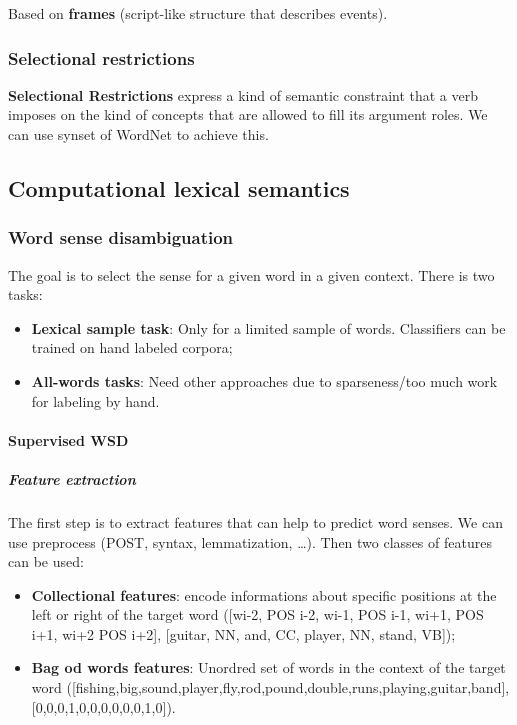 Based on \textbf{frames} (script-like structure that describes events).

\subsubsection{Selectional restrictions}

\textbf{Selectional Restrictions} express a kind of semantic constraint that a verb imposes on the kind of concepts that are allowed to fill its argument roles. We can use synset of WordNet to achieve this.

\subsection{Computational lexical semantics}

\subsubsection{Word sense disambiguation}

The goal is to select the sense for a given word in a given context. There is two tasks:
\begin{itemize}
	\item \textbf{Lexical sample task}: Only for a limited sample of words. Classifiers can be trained on hand labeled corpora;
	\item \textbf{All-words tasks}: Need other approaches due to sparseness/too much work for labeling by hand.
\end{itemize}

\newpage

\paragraph{Supervised WSD}

\subparagraph{Feature extraction}

The first step is to extract features that can help to predict word senses. We can use preprocess (POST, syntax, lemmatization, \dots). Then two classes of features can be used:

\begin{itemize}
	\item \textbf{Collectional features}: encode informations about specific positions at the left or right of the target word ([wi-2, POS i-2, wi-1, POS i-1, wi+1, POS i+1, wi+2 POS i+2], [guitar, NN, and, CC, player, NN, stand, VB]);
	\item \textbf{Bag od words features}: Unordred set of words in the context of the target word ([fishing,big,sound,player,fly,rod,pound,double,runs,playing,guitar,band], [0,0,0,1,0,0,0,0,0,0,1,0]).
\end{itemize}



